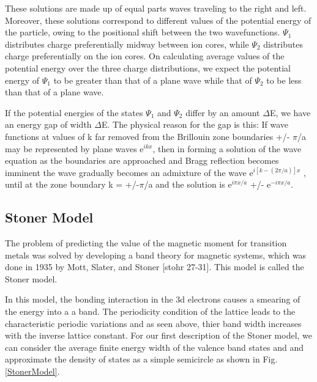 These solutions are made up of equal parts waves traveling to the right and left. Moreover, these solutions correspond to different values of the potential energy of the particle, owing to the positional shift between the two wavefunctions. $\Psi_1$ distributes charge preferentially midway between ion cores, while $\Psi_2$ distributes charge preferentially on the ion cores. On calculating average values of the potential energy over the three charge distributions, we expect the potential energy of $\Psi_1$ to be greater than that of a plane wave while that of $\Psi_2$ to be less than that of a plane wave.

If the potential energies of the states  $\Psi_1$ and $\Psi_2$ differ by an amount $\Delta$E, we have an energy gap  of width $\Delta$E. The physical reason for the gap is this: If wave functions at values of k far removed from the Brillouin zone boundaries +/- $\pi$/a may be represented by plane waves e$^{ikx}$, then in forming a solution of the wave equation as the boundaries are approached and Bragg reflection becomes imminent the wave gradually becomes an admixture of the wave e$^{i[k-(2\pi/a)]x}$ , until at the zone boundary k = +/-$\pi$/a and the solution is e$^{i\pi x/a}$ +/- e$^{-i\pi x /a}$. 

\subsection{Stoner Model}
The problem of predicting the value of the magnetic moment for transition metals was solved by developing a band theory for magnetic systems, which was done in 1935 by Mott, Slater, and Stoner [stohr 27-31]. This model is called the Stoner model. 

In this model, the bonding interaction in the 3d electrons causes a smearing of the energy into a a band. The periodicity condition of the lattice leads to the characteristic periodic variations and as seen above, thier band width increases with the inverse lattice constant. For our first description of the Stoner model, we can consider the average finite energy width of the valence band states and  and approximate the density of states as a simple semicircle as shown in Fig. \ref{StonerModel}.


